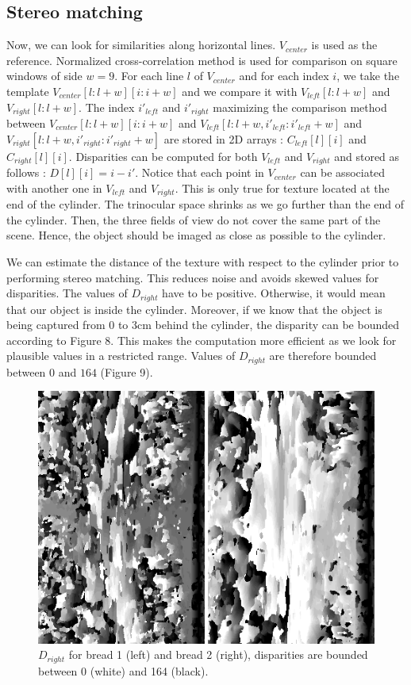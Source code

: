 \documentclass[a4paper,twocolumn,fleqn]{article}
\begin{document}
\subsection{Stereo matching}
Now, we can look for similarities along horizontal lines. $V_{center}$ is used as the reference. Normalized cross-correlation method is used for comparison on square windows of side $w=9$. For each line $l$ of $V_{center}$ and for each index $i$, we take the template $V_{center}[l:l+w][i:i+w]$ and we compare it with $V_{left}[l:l+w]$ and $V_{right}[l:l+w]$. The index $i'_{left}$ and $i'_{right}$ maximizing the comparison method between $V_{center}[l:l+w][i:i+w]$ and $V_{left}[l:l+w, i'_{left}:i'_{left}+w]$ and $V_{right}[l:l+w, i'_{right}:i'_{right}+w]$ are stored in 2D arrays : $C_{left}[l][i] $ and $C_{right}[l][i]$. Disparities can be computed for both $V_{left}$ and $V_{right}$ and stored as follows : $D[l][i] = i-i'$. Notice that each point in $V_{center}$ can be associated with another one in $V_{left}$ and $V_{right}$. This is only true for texture located at the end of the cylinder. The trinocular space shrinks as we go further than the end of the cylinder. Then, the three fields of view do not cover the same part of the scene. Hence, the object should be imaged as close as possible to the cylinder.

We can estimate the distance of the texture with respect to the cylinder prior to performing stereo matching. This reduces noise and avoids skewed values for disparities. The values of $D_{right}$ have to be positive. Otherwise, it would mean that our object is inside the cylinder. Moreover, if we know that the object is being captured from $0$ to $3$cm behind the cylinder, the disparity can be bounded according to Figure 8. This makes the computation more efficient as we look for plausible values in a restricted range. Values of $D_{right}$ are therefore bounded between $0$ and $164$ (Figure 9).

\begin{figure}[!t]
  \centering
  \includegraphics[width=0.8\columnwidth]{img/disp_map.png}
  \caption{$D_{right}$ for bread 1 (left) and bread 2 (right), disparities are bounded between 0 (white) and 164 (black).}
\end{figure}
\end{document}
